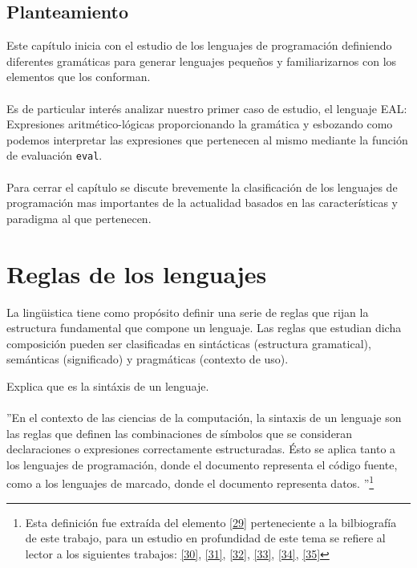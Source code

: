 \subsection*{Planteamiento}
    Este capítulo inicia con el estudio de los lenguajes de programación definiendo diferentes gramáticas para generar lenguajes pequeños y familiarizarnos con los elementos que los conforman.\\\\
    Es de particular interés analizar nuestro primer caso de estudio, el lenguaje \textsf{EAL}: Expresiones aritmético-lógicas proporcionando la gramática y esbozando como podemos interpretar las expresiones que pertenecen al mismo mediante la función de evaluación \texttt{eval}.\\\\
    Para cerrar el capítulo se discute brevemente la clasificación de los lenguajes de programación mas importantes de la actualidad basados en las características y paradigma al que pertenecen. 

\section{Reglas de los lenguajes}

    La lingüistica tiene como propósito definir una serie de reglas que rijan la estructura fundamental que compone un lenguaje.
Las reglas que estudian dicha composición pueden ser clasificadas en sintácticas (estructura gramatical), semánticas (significado) y pragmáticas (contexto de uso).\\


    \begin{exercise}
        Explica que es la sintáxis  de un lenguaje.     \\\\
        ''En el contexto de las ciencias de la computación, la sintaxis de un lenguaje son las reglas que definen las combinaciones de símbolos que se consideran declaraciones o expresiones correctamente estructuradas. Ésto se aplica tanto a los lenguajes de programación, donde el documento representa el código fuente, como a los lenguajes de marcado, donde el documento representa datos. ''\footnote{Esta definición fue extraída del elemento  \hyperlink{29}{[29]} perteneciente a la bilbiografía de este trabajo, para un estudio en profundidad de este tema se refiere al lector a los siguientes trabajos: \hyperlink{30}{[30]}, \hyperlink{31}{[31]}, \hyperlink{32}{[32]}, \hyperlink{33}{[33]}, \hyperlink{34}{[34]}, \hyperlink{35}{[35]}}
        
    \end{exercise}


